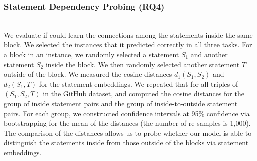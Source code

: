 \vspace{2pt}
\subsubsection{Statement Dependency Probing (RQ4)}~\\
We evaluate if {\tool} could learn the connections among the
statements inside the same  block. We selected the instances
that it predicted correctly in all three tasks. For a 
block in an instance, we randomly selected a statement $S_1$ and
another statement $S_2$ inside the block. We then randomly selected
another statement $T$ outside of the block. We measured the cosine
distances $d_1(S_1,S_2)$ and $d_2(S_1,T)$ for the statement
embeddings. We repeated that for all triples of $(S_1,S_2,T)$ in the
GitHub dataset, and computed the cosine distances for the group of
inside statement pairs and the group of inside-to-outside statement
pairs. For each group, we constructed confidence intervals at 95\%
confidence via bootstrapping for the mean of the distances (the number
of re-samples is 1,000). The comparison of the distances allows us to
probe whether our model is able to distinguish the statements inside
from those outside of the  blocks via statement embeddings.

